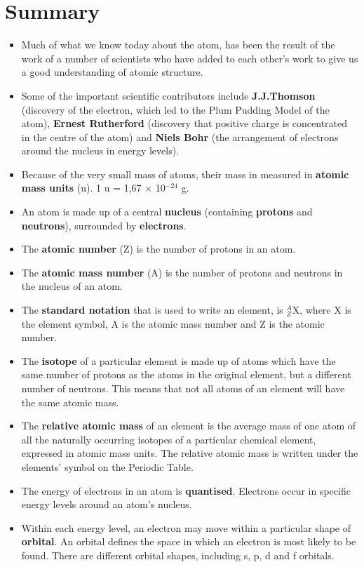 \section{Summary}
\begin{itemize}
\item{Much of what we know today about the atom, has been the result of the work of a number of scientists who have added to each other's work to give us a good understanding of atomic structure.}
\item{Some of the important scientific contributors include \textbf{J.J.Thomson} (discovery of the electron, which led to the Plum Pudding Model of the atom), \textbf{Ernest Rutherford} (discovery that positive charge is concentrated in the centre of the atom) and \textbf{Niels Bohr} (the arrangement of electrons around the nucleus in energy levels).}
\item{Because of the very small mass of atoms, their mass in measured in \textbf{atomic mass units} (u). 1 u = 1,67 $\times$ 10$^{-24}$ g.}
\item{An atom is made up of a central \textbf{nucleus} (containing \textbf{protons} and \textbf{neutrons}), surrounded by \textbf{electrons}.}
\item{The \textbf{atomic number} (Z) is the number of protons in an atom.}
\item{The \textbf{atomic mass number} (A) is the number of protons and neutrons in the nucleus of an atom.}
\item{The \textbf{standard notation} that is used to write an element, is $^{A}_{Z}$X, where X is the element symbol, A is the atomic mass number and Z is the atomic number.}
\item{The \textbf{isotope} of a particular element is made up of atoms which have the same number of protons as the atoms in the original element, but a different number of neutrons. This means that not all atoms of an element will have the same atomic mass.}
\item{The \textbf{relative atomic mass} of an element is the average mass of one atom of all the naturally occurring isotopes of a particular chemical element, expressed in atomic mass units. The relative atomic mass is written under the elements' symbol on the Periodic Table.}
\item{The energy of electrons in an atom is \textbf{quantised}. Electrons occur in specific energy levels around an atom's nucleus.}
\item{Within each energy level, an electron may move within a particular shape of \textbf{orbital}. An orbital defines the space in which an electron is most likely to be found. There are different orbital shapes, including s, p, d and f orbitals.}

\end{itemize}
